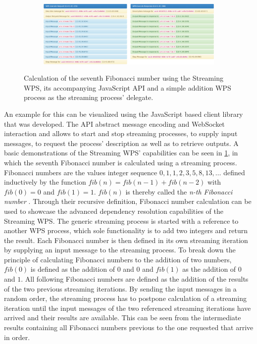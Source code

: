 \begin{figure}
\begin{subfigure}{\fibfigsize}
        \includegraphics[width=\linewidth]{figures/fibonacci-4.png}
      \end{subfigure}
      \caption{\label{fig:client}Calculation of the seventh Fibonacci number using the Streaming WPS, its accompanying JavaScript API and a simple addition WPS process as the streaming process' delegate.}
    \end{figure}

    An example for this can be visualized using the JavaScript based client library that was developed. The \ac{API} abstract message encoding and WebSocket interaction and allows to start and stop streaming processes, to supply input messages, to request the process' description as well as to retrieve outputs. A basic demonstrations of the Streaming WPS' capabilities can be seen in \cref{fig:client}, in which the seventh Fibonacci number is calculated using a streaming process. Fibonacci numbers are the values integer sequence $0, 1, 1, 2, 3, 5, 8, 13, \dots$ defined inductively by the function $fib(n) = fib(n-1) + fib(n-2)$ with $fib(0) = 0$ and $fib(1) = 1$. $fib(n)$ is thereby called the \emph{n-th Fibonacci number} \citep{fibonacci}. Through their recursive definition, Fibonacci number calculation can be used to showcase the advanced dependency resolution capabilities of the Streaming WPS. The generic streaming process is started with a reference to another WPS process, which sole functionality is to add two integers and return the result. Each Fibonacci number is then defined in its own streaming iteration by supplying an input message to the streaming process. To break down the principle of calculating Fibonacci numbers to the addition of two numbers, $fib(0)$ is defined as the addition of $0$ and $0$ and $fib(1)$ as the addition of $0$ and $1$. All following Fibonacci numbers are defined as the addition of the results of the two previous streaming iterations. By sending the input messages in a random order, the streaming process has to postpone calculation of a streaming iteration until the input messages of the two referenced streaming iterations have arrived and their results are available. This can be seen from the intermediate results containing all Fibonacci numbers previous to the one requested that arrive in order.

